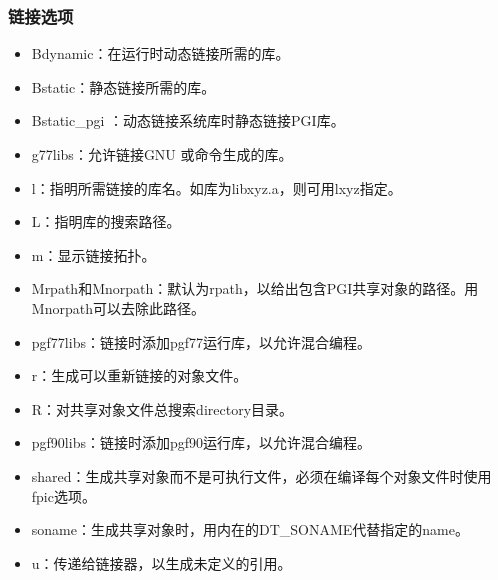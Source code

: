\documentclass[a4paper,12pt,english]{sphinxmanual}
\begin{document}
\subsubsection{链接选项}
\label{\detokenize{compiler/pgi:id10}}\begin{itemize}
\item {} 
\sphinxAtStartPar
\sphinxhyphen{}Bdynamic：在运行时动态链接所需的库。

\item {} 
\sphinxAtStartPar
\sphinxhyphen{}Bstatic：静态链接所需的库。

\item {} 
\sphinxAtStartPar
\sphinxhyphen{}Bstatic\_pgi ：动态链接系统库时静态链接PGI库。

\item {} 
\sphinxAtStartPar
\sphinxhyphen{}g77libs：允许链接GNU 或命令生成的库。

\item {} 
\sphinxAtStartPar
\sphinxhyphen{}l：指明所需链接的库名。如库为libxyz.a，则可用\sphinxhyphen{}lxyz指定。

\item {} 
\sphinxAtStartPar
\sphinxhyphen{}L：指明库的搜索路径。

\item {} 
\sphinxAtStartPar
\sphinxhyphen{}m：显示链接拓扑。

\item {} 
\sphinxAtStartPar
\sphinxhyphen{}Mrpath和\sphinxhyphen{}Mnorpath：默认为\sphinxhyphen{}rpath，以给出包含PGI共享对象的路径。用\sphinxhyphen{}Mnorpath可以去除此路径。

\item {} 
\sphinxAtStartPar
\sphinxhyphen{}pgf77libs：链接时添加pgf77运行库，以允许混合编程。

\item {} 
\sphinxAtStartPar
\sphinxhyphen{}r：生成可以重新链接的对象文件。

\item {} 
\sphinxAtStartPar
\sphinxhyphen{}R：对共享对象文件总搜索directory目录。

\item {} 
\sphinxAtStartPar
\sphinxhyphen{}pgf90libs：链接时添加pgf90运行库，以允许混合编程。

\item {} 
\sphinxAtStartPar
\sphinxhyphen{}shared：生成共享对象而不是可执行文件，必须在编译每个对象文件时使用\sphinxhyphen{}fpic选项。

\item {} 
\sphinxAtStartPar
\sphinxhyphen{}soname：生成共享对象时，用内在的DT\_SONAME代替指定的name。

\item {} 
\sphinxAtStartPar
\sphinxhyphen{}u：传递给链接器，以生成未定义的引用。

\end{itemize}
\end{document}
